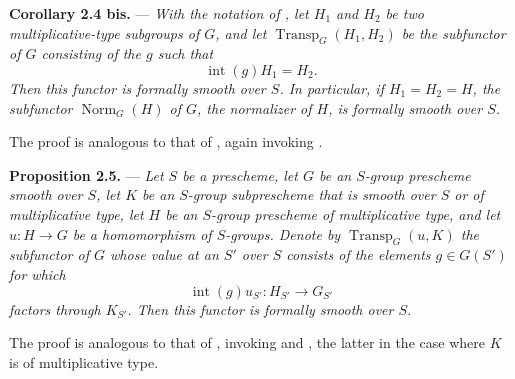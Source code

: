 \medskip
\noindent{}\textbf{Corollary 2.4 bis.} ---
\textit{With the notation of
, let \(H_1\) and
\(H_2\) be two multiplicative-type subgroups of \(G\), and let
\(\operatorname{Transp}_G(H_1,H_2)\) be the subfunctor of \(G\)
consisting of the \(g\) such that
\[
  \operatorname{int}(g)H_1=H_2.
\]
Then this functor is formally smooth over \(S\).  In particular, if
\(H_1=H_2=H\), the subfunctor
\(\operatorname{Norm}_G(H)\) of \(G\), the normalizer of \(H\), is
formally smooth over \(S\).}

The proof is analogous to that of
, again invoking .

\medskip
\noindent{}\textbf{Proposition 2.5.} ---
\textit{Let \(S\) be a prescheme, let \(G\) be an \(S\)-group
prescheme smooth over \(S\), let \(K\) be an \(S\)-group
subprescheme that is smooth over \(S\) or of multiplicative type,
let \(H\) be an \(S\)-group prescheme of multiplicative type, and let
\(u:H\to G\) be a homomorphism of \(S\)-groups.  Denote by
\(\operatorname{Transp}_G(u,K)\) the subfunctor of \(G\) whose value
at an \(S'\) over \(S\) consists of the elements \(g\in G(S')\) for
which}
\[
  \operatorname{int}(g)u_{S'}:
  H_{S'}\longrightarrow G_{S'}
\]
\textit{factors through \(K_{S'}\).  Then this functor is formally
smooth over \(S\).}

The proof is analogous to that of
, invoking  and
, the latter in the case where \(K\) is of
multiplicative type.

